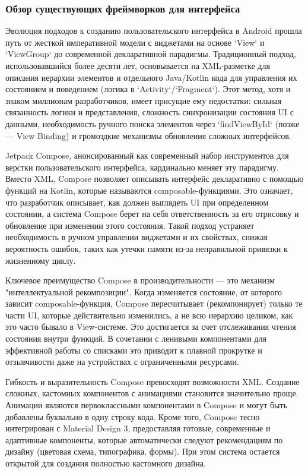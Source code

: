 \subsubsection{Обзор существующих фреймворков для интерфейса}

Эволюция подходов к созданию пользовательского интерфейса в Android прошла путь от жесткой императивной модели с виджетами на основе `View` и `ViewGroup` до современной декларативной парадигмы. Традиционный подход, использовавшийся более десяти лет, основывается на XML-разметке для описания иерархии элементов и отдельного Java/Kotlin кода для управления их состоянием и поведением (логика в `Activity`/`Fragment`). Этот метод, хотя и знаком миллионам разработчиков, имеет присущие ему недостатки: сильная связанность логики и представления, сложность синхронизации состояния UI с данными, необходимость ручного поиска элементов через `findViewById` (позже — View Binding) и громоздкие механизмы обновления сложных интерфейсов.

Jetpack Compose, анонсированный как современный набор инструментов для верстки пользовательского интерфейса, кардинально меняет эту парадигму. Вместо XML, Compose позволяет описывать интерфейс декларативно с помощью функций на Kotlin, которые называются composable-функциями. Это означает, что разработчик описывает, как должен выглядеть UI при определенном состоянии, а система Compose берет на себя ответственность за его отрисовку и обновление при изменении этого состояния. Такой подход устраняет необходимость в ручном управлении виджетами и их свойствах, снижая вероятность ошибок, таких как утечки памяти из-за неправильной привязки к жизненному циклу. \cite{refd}

Ключевое преимущество Compose в производительности — это механизм "интеллектуальной рекомпозиции". Когда изменяется состояние, от которого зависит composable-функция, Compose пересчитывает (рекомпонирует) только те части UI, которые действительно изменились, а не всю иерархию целиком, как это часто бывало в View-системе. Это достигается за счет отслеживания чтения состояния внутри функций. В сочетании с ленивыми компонентами для эффективной работы со списками это приводит к плавной прокрутке и отзывчивости даже на устройствах с ограниченными ресурсами. \cite{refd}

Гибкость и выразительность Compose превосходят возможности XML. Создание сложных, кастомных компонентов с анимациями становится значительно проще. Анимации являются первоклассными компонентами в Compose и могут быть добавлены буквально в одну строку кода. Кроме того, Compose тесно интегрирован с Material Design 3, предоставляя готовые, современные и адаптивные компоненты, которые автоматически следуют рекомендациям по дизайну (цветовая схема, типографика, формы). При этом система остается открытой для создания полностью кастомного дизайна. \cite{refd}


